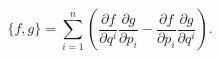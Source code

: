 \begin{equation}
            \label{eq:CanPoisson}
            \{f,g\} = \sum_{i=1}^n \left( 
                \frac{\partial f}{\partial q^i}
                \frac{\partial g}{\partial p_i}
                -
                \frac{\partial f}{\partial p_i}
                \frac{\partial g}{\partial q^i}
            \right).
        \end{equation}

